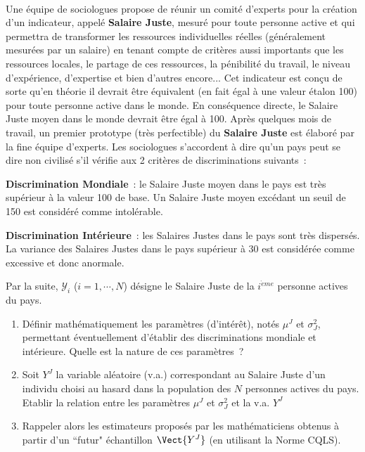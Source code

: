 \documentclass[10pt]{report}
\begin{document}
\begin{exercice} ${ }$

Une équipe de sociologues propose de réunir un comité d'experts pour la création d'un indicateur, appelé \textbf{Salaire Juste}, mesuré pour toute personne active et qui permettra de transformer les ressources individuelles réelles (généralement mesurées par un salaire) en tenant compte de critères aussi importants que les ressources locales, le partage de ces ressources, la pénibilité du travail, le niveau d'expérience, d'expertise et bien d'autres encore...
Cet indicateur est conçu de sorte qu'en théorie il devrait être équivalent (en fait égal à une valeur étalon 100) pour toute personne active dans le monde. En conséquence directe, le Salaire Juste moyen dans le monde devrait être égal à 100.
Après quelques mois de travail, un premier prototype (très perfectible) du \textbf{Salaire Juste} est élaboré par la fine équipe d'experts.
Les sociologues s'accordent à dire qu'un pays peut se dire non civilisé s'il vérifie aux 2 critères de discriminations suivants~:
\begin{list}{} 
\item \textbf{Discrimination Mondiale}~: le Salaire Juste moyen dans le pays est très supérieur à  la valeur 100 de base. Un Salaire Juste moyen excédant un seuil de 150 est considéré comme intolérable.
\item \textbf{Discrimination Intérieure}~: les Salaires Justes dans le pays sont très dispersés. La variance des Salaires Justes dans le pays supérieur à 30 est considérée comme excessive et donc anormale.
\end{list}
Par la suite, $\mathcal{Y}_i$ ($i=1,\cdots,N$) désigne le Salaire Juste de la $i^{\grave eme}$ personne actives du pays.
\begin{enumerate}
\item Définir mathématiquement les paramètres (d'intérêt), notés $\mu^J$ et $\sigma^2_J$, permettant éventuellement d'établir des discriminations mondiale et intérieure.  Quelle est la nature de ces paramètres~?
\item Soit $Y^J$ la variable aléatoire (v.a.) correspondant au Salaire Juste d'un individu choisi au hasard dans la population des $N$ personnes actives du pays. Etablir la relation entre les paramètres $\mu^J$ et $\sigma^2_J$ et la v.a. $Y^J$
\item Rappeler alors les estimateurs proposés par les mathématiciens obtenus à partir d'un ``futur" échantillon $\Vect{Y^J}$ (en utilisant la Norme CQLS).

\end{enumerate}
\end{exercice}
\end{document}
